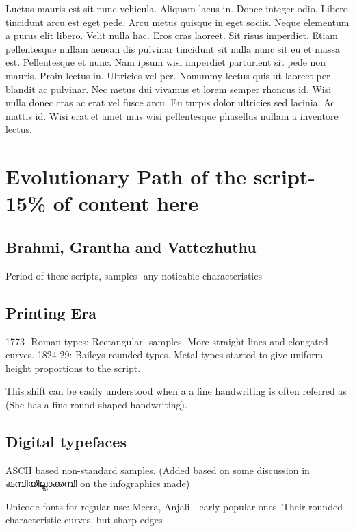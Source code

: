 \documentclass[10pt]{article}
\begin{document}
Luctus mauris est sit nunc vehicula. Aliquam lacus in. Donec integer odio. Libero tincidunt arcu est eget pede. Arcu metus quisque in eget sociis. Neque elementum a purus elit libero. Velit nulla hac. Eros cras laoreet. Sit risus imperdiet. Etiam pellentesque nullam aenean dis pulvinar tincidunt sit nulla nunc sit eu et massa est. Pellentesque et nunc. Nam ipsum wisi imperdiet parturient sit pede non mauris. Proin lectus in. Ultricies vel per. Nonummy lectus quis ut laoreet per blandit ac pulvinar. Nec metus dui vivamus et lorem semper rhoncus id. Wisi nulla donec cras ac erat vel fusce arcu. Eu turpis dolor ultricies sed lacinia. Ac mattis id. Wisi erat et amet mus wisi pellentesque phasellus nullam a inventore lectus.

\section{Evolutionary Path of the script-15\% of content here}

\subsection{Brahmi, Grantha and Vattezhuthu}

Period of these scripts, samples- any noticable characteristics

\subsection{Printing Era}

1773- Roman types: Rectangular- samples.
More straight lines and elongated curves. 
1824-29: Baileys  rounded types. Metal types started to give uniform height proportions to the script.

This shift can be easily understood when a a fine handwriting is often referred as { } (She has a fine round shaped handwriting).


\subsection{Digital typefaces}

ASCII based non-standard samples. (Added based on some discussion in {\manjari കമ്പിയില്ലാക്കമ്പി} on the infographics made) 

Unicode fonts for regular use: Meera, Anjali - early popular ones.  Their rounded characteristic curves, but sharp edges
\end{document}
